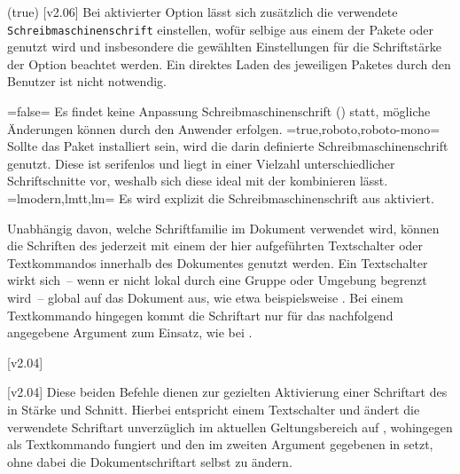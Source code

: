 \begin{DeclareEntity*}{}
\begin{DeclareEntity*}{}
\begin{DeclareEntity*}{}
\begin{Declaration}
  {}
  (true)
  [v2.06]
\printdeclarationlist
Bei aktivierter Option  lässt sich zusätzlich die verwendete
\texttt{Schreibmaschinenschrift} einstellen, wofür selbige aus einem der Pakete 
 oder  genutzt wird und insbesondere die 
gewählten Einstellungen für die Schriftstärke der Option  
beachtet werden. Ein direktes Laden des jeweiligen Paketes durch den Benutzer 
ist nicht notwendig.
\begin{DeclareValues}
\itemval=false=
  Es findet keine Anpassung Schreibmaschinenschrift () statt, 
  mögliche Änderungen können durch den Anwender erfolgen.
\itemval*=true,roboto,roboto-mono=
  Sollte das Paket  installiert sein, wird die darin 
  definierte Schreibmaschinenschrift genutzt. Diese ist serifenlos und liegt in 
  einer Vielzahl unterschiedlicher Schriftschnitte vor, weshalb sich diese 
  ideal mit der \OpenSans kombinieren lässt.
\itemval=lmodern,lmtt,lm=
  Es wird explizit die Schreibmaschinenschrift aus  aktiviert. 
\end{DeclareValues}
\end{Declaration}



Unabhängig davon, welche Schriftfamilie im Dokument verwendet wird, können die 
Schriften des \CDs jederzeit mit einem der hier aufgeführten Textschalter oder 
Textkommandos innerhalb des Dokumentes genutzt werden. Ein Textschalter wirkt 
sich~-- wenn er nicht lokal durch eine Gruppe oder Umgebung begrenzt wird~-- 
global auf das Dokument aus, wie etwa beispielsweise . Bei 
einem Textkommando hingegen kommt die Schriftart nur für das nachfolgend 
angegebene Argument zum Einsatz, wie bei . 
%
\begin{Declaration}
  {}
  [v2.04]
\begin{Declaration}
  {}
  [v2.04]
\printdeclarationlist
%
Diese beiden Befehle dienen zur gezielten Aktivierung einer Schriftart des \CDs 
in Stärke und Schnitt. Hierbei entspricht  einem Textschalter und 
ändert die verwendete Schriftart unverzüglich im aktuellen Geltungsbereich auf 
, wohingegen  als Textkommando fungiert und den 
im zweiten Argument gegebenen  in  setzt, ohne 
dabei die Dokumentschriftart selbst zu ändern.


\end{Declaration}
\end{Declaration}
\end{DeclareEntity*}
\end{DeclareEntity*}
\end{DeclareEntity*}
